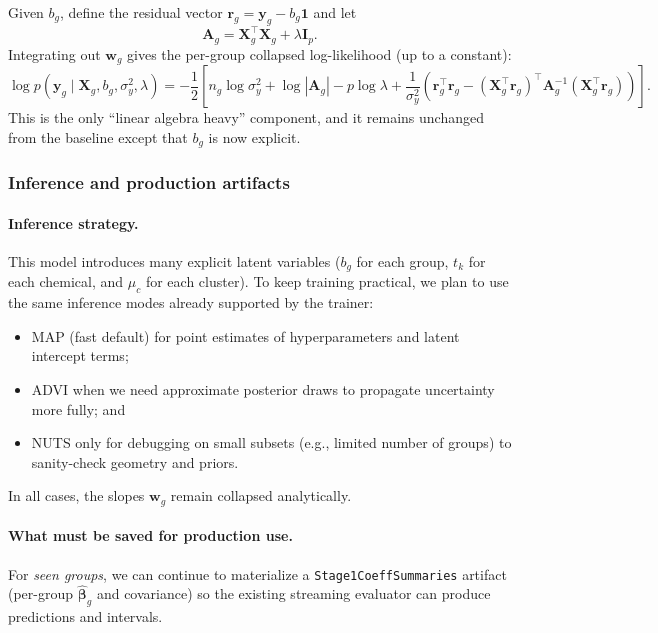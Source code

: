 \documentclass[11pt]{article}
\begin{document}
Given $b_g$, define the residual vector $\bm{r}_g = \bm{y}_g - b_g\bm{1}$ and let
\[
  \bm{A}_g = \bm{X}_g^\top \bm{X}_g + \lambda \bm{I}_p.
\]
Integrating out $\bm{w}_g$ gives the per-group collapsed log-likelihood (up to a constant):
\[
  \log p(\bm{y}_g \mid \bm{X}_g, b_g, \sigma_y^2, \lambda)
  = -\frac{1}{2}\left[
    n_g \log \sigma_y^2
    + \log|\bm{A}_g|
    - p\log \lambda
    + \frac{1}{\sigma_y^2}\left(\bm{r}_g^\top \bm{r}_g - (\bm{X}_g^\top \bm{r}_g)^\top \bm{A}_g^{-1}(\bm{X}_g^\top \bm{r}_g)\right)
  \right].
\]
This is the only ``linear algebra heavy'' component, and it remains unchanged from the baseline except that $b_g$ is now explicit.

\subsubsection{Inference and production artifacts}

\paragraph{Inference strategy.}
This model introduces many explicit latent variables ($b_g$ for each group, $t_k$ for each chemical, and $\mu_c$ for each cluster).
To keep training practical, we plan to use the same inference modes already supported by the trainer:
\begin{itemize}
  \item MAP (fast default) for point estimates of hyperparameters and latent intercept terms;
  \item ADVI when we need approximate posterior draws to propagate uncertainty more fully; and
  \item NUTS only for debugging on small subsets (e.g., limited number of groups) to sanity-check geometry and priors.
\end{itemize}
In all cases, the slopes $\bm{w}_g$ remain collapsed analytically.

\paragraph{What must be saved for production use.}
For \emph{seen groups}, we can continue to materialize a \texttt{Stage1CoeffSummaries} artifact (per-group $\hat{\bm{\beta}}_g$ and
covariance) so the existing streaming evaluator can produce predictions and intervals.
\end{document}
